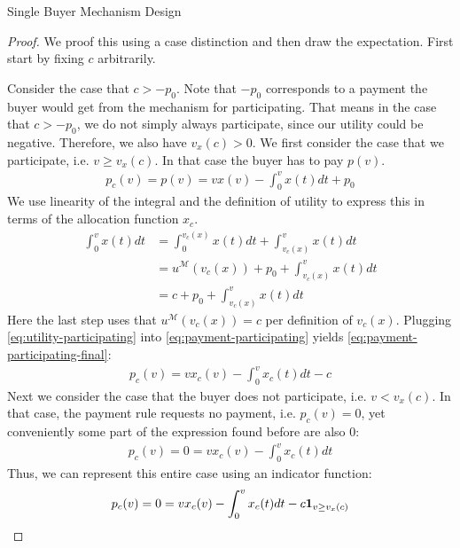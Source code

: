 \documentclass[11pt,a4paper]{article}
\newcommand{\1}[1]{\mbox{\rm\bf 1}_{#1}}
\begin{document}
\begin{section}{Single Buyer Mechanism Design}
 \begin{proof}
     We proof this using a case distinction and then draw the expectation.
     First start by fixing $c$ arbitrarily.

     Consider the case that $c > -p_0$. Note that $-p_0$ corresponds to a payment the buyer would get from the mechanism for participating.
     That means in the case that $c > -p_0$, we do not simply always participate, since our utility could be negative. Therefore, we also have $v_x(c) > 0$.
     We first consider the case that we participate, i.e. $v \geq v_x(c)$.
     In that case the buyer has to pay $p(v)$.
     \begin{align}
         \label{eq:payment-participating}
         p_c(v) = p(v) = v x(v) - \int_0^v x(t) dt + p_0
     \end{align}
     We use linearity of the integral and the definition of utility to express this in terms of the allocation function $x_c$.
     \begin{equation}
         \label{eq:utility-participating}
         \begin{aligned}
             \int_0^v x(t) dt & = \int_0^{v_c(x)} x(t) dt + \int_{v_c(x)}^v x(t) dt     \\
                              & = u^\mathcal{M}(v_c(x)) + p_0 + \int_{v_c(x)}^v x(t) dt \\
                              & = c + p_0 + \int_{v_c(x)}^v x(t) dt
         \end{aligned}
     \end{equation}
     Here the last step uses that $u^\mathcal{M}(v_c(x)) = c$ per definition of $v_c(x)$.
     Plugging \cref{eq:utility-participating} into \cref{eq:payment-participating} yields \cref{eq:payment-participating-final}:
     \begin{align}
         \label{eq:payment-participating-final}
         p_c(v) = v x_c(v) - \int_0^v x_c(t) dt - c
     \end{align}
     Next we consider the case that the buyer does not participate, i.e. $v < v_x(c)$.
     In that case, the payment rule requests no payment, i.e. $p_c(v) = 0$, yet conveniently some part of the expression found before are also $0$:
     \begin{align*}
         p_c(v) = 0 = v x_c(v) - \int_0^v x_c(t) dt
     \end{align*}
     Thus, we can represent this entire case using an indicator function:
     \begin{align*}
         p_c(v) = 0 = v x_c(v) - \int_0^v x_c(t) dt - c \1{v \geq v_x(c)}

\end{align*}
\end{proof}
\end{section}
\end{document}
